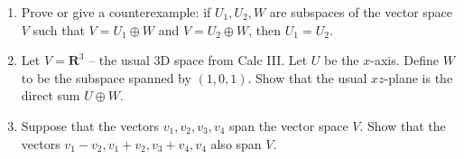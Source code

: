 \documentclass[12pt]{article}
\begin{document}
\begin{enumerate}
\item  Prove or give a counterexample:  if $U_1, U_2,W$ are subspaces of the vector space $V$ such that $V = U_1 \oplus W$ and $V = U_2 \oplus W$, then $U_1 = U_2$.

\item  Let $V = \mathbf{R}^3$ -- the usual 3D space from Calc III.  Let $U$ be the $x$-axis.  Define $W$ to be the subspace spanned by $(1,0,1)$.  Show that the usual $xz$-plane is the direct sum $U \oplus W$.

\item  Suppose that the vectors $v_1, v_2, v_3, v_4$ span the vector space $V$.  Show that the vectors $v_1-v_2, v_1+v_2, v_3+v_4, v_4$ also span $V$.

\end{enumerate}
\end{document}
